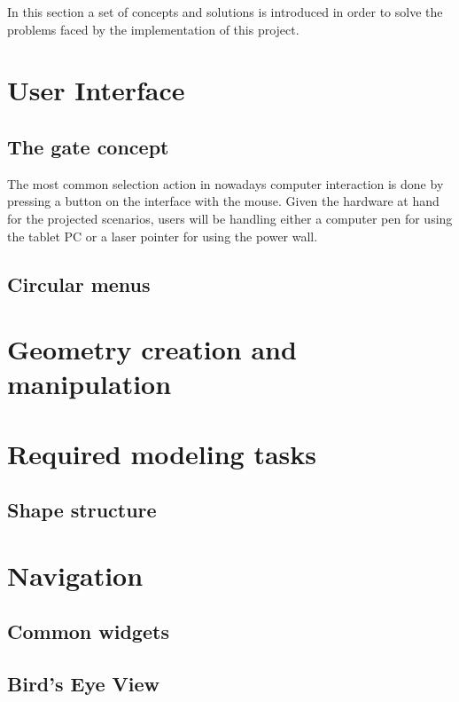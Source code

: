 
In this section a set of concepts and solutions is introduced in order to solve the problems faced
by the implementation of this project.

\section{User Interface}

\subsection{The gate concept}

The most common selection action in nowadays computer interaction is done by pressing a button on
the interface with the mouse. Given the hardware at hand for the projected scenarios, users will
be handling either a computer pen for using the tablet PC or a laser pointer for using the power wall.

\subsection{Circular menus}


\section{Geometry creation and manipulation}

\section{Required modeling tasks}

\subsection{Shape structure}


\section{Navigation}

\subsection{Common widgets}

\subsection{Bird's Eye View}

